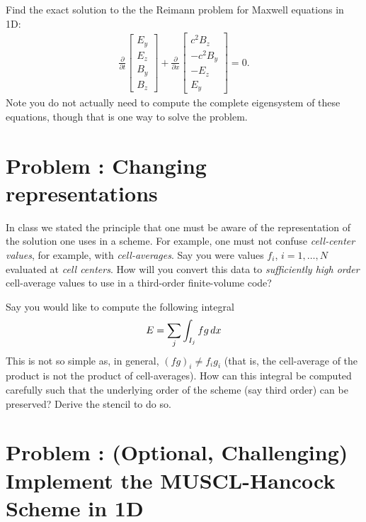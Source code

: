 \documentclass[12pt]{article}
\theoremstyle{definition}
\theoremstyle{definition}
\theoremstyle{definition}
\newcounter{probnum}
\begin{document}
Find the exact solution to the the Reimann problem for Maxwell
equations in 1D:
\begin{align*}
  \frac{\partial }{\partial t}
  \left[
    \begin{matrix}
      E_y \\
      E_z \\
      B_y \\
      B_z
    \end{matrix}
  \right]
  +
  \frac{\partial }{\partial x}
  \left[
    \begin{matrix}
      c^2B_z \\
      -c^2B_y \\
      -E_z \\
      E_y
    \end{matrix}
  \right]
  =
  0.
\end{align*}
Note you do not actually need to compute the complete eigensystem of
these equations, though that is one way to solve the problem.

\section*{Problem : Changing representations}

In class we stated the principle that one must be aware of the
representation of the solution one uses in a scheme. For example, one
must not confuse \emph{cell-center values}, for example, with
\emph{cell-averages}. Say you were values $f_i$, $i=1,\ldots,N$
evaluated at \emph{cell centers}. How will you convert this data to
\emph{sufficiently high order} cell-average values to use in a
third-order finite-volume code?

Say you would like to compute the following integral
\begin{align*}
  E = \sum_j \int_{I_j} f g \thinspace dx
\end{align*}
This is not so simple as, in general, $(f g)_i \neq f_i g_i$ (that is,
the cell-average of the product is not the product of
cell-averages). How can this integral be computed carefully such that
the underlying order of the scheme (say third order) can be preserved?
Derive the stencil to do so.

\section*{Problem : (Optional, Challenging) Implement
  the MUSCL-Hancock Scheme in 1D}
\end{document}
